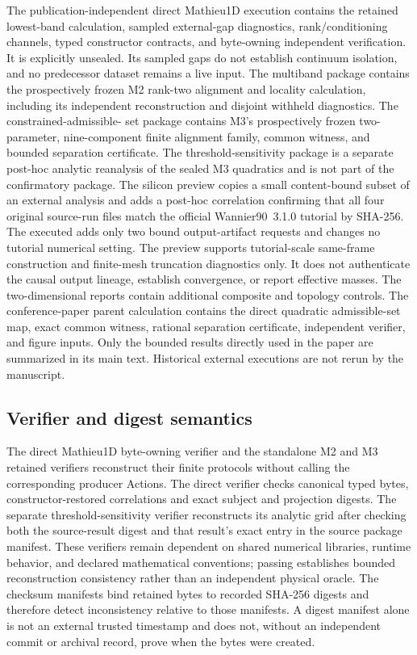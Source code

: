 The publication-independent direct Mathieu1D execution contains the retained lowest-band
calculation, sampled external-gap diagnostics, rank/conditioning channels, typed
constructor contracts, and byte-owning independent verification. It is explicitly
unsealed. Its sampled gaps do not establish continuum isolation, and no predecessor
dataset remains a live input.
The multiband package contains the prospectively frozen
M2 rank-two alignment and locality calculation, including its independent
reconstruction and disjoint withheld diagnostics. The constrained-admissible-
set package contains M3's prospectively frozen two-parameter, nine-component
finite alignment family, common witness, and bounded separation certificate.
The threshold-sensitivity package is a separate post-hoc analytic reanalysis of
the sealed M3 quadratics and is not part of the confirmatory package. The
silicon preview copies a small content-bound subset of an external analysis and
adds a post-hoc correlation confirming that all four original source-run files
match the official Wannier90~3.1.0  tutorial by
SHA-256. The executed  adds only two bound output-artifact
requests and changes no tutorial numerical setting. The preview supports
tutorial-scale same-frame construction and finite-mesh truncation
diagnostics only. It does not authenticate the causal output lineage,
establish convergence, or report effective masses. The two-dimensional reports
contain additional composite and topology controls.
The conference-paper parent calculation contains the direct quadratic
admissible-set map, exact common witness, rational separation certificate,
independent verifier, and figure inputs. Only the bounded results
directly used in the paper are summarized in its main text. Historical external
executions are not rerun by the manuscript.

\subsection{Verifier and digest semantics}

The direct Mathieu1D byte-owning verifier and the standalone M2 and M3 retained
verifiers reconstruct their finite protocols without calling the corresponding
producer Actions. The direct verifier checks canonical typed bytes,
constructor-restored correlations and exact subject and projection digests. The separate
threshold-sensitivity verifier
reconstructs its analytic grid after checking both the source-result digest and
that result's exact entry in the source package manifest. These verifiers
remain dependent on shared numerical libraries, runtime behavior, and declared
mathematical conventions; passing establishes bounded reconstruction
consistency rather than an independent physical oracle.
The checksum manifests bind retained bytes to recorded SHA-256 digests and
therefore detect inconsistency relative to those manifests. A digest manifest
alone is not an external trusted timestamp and does not, without an independent
commit or archival record, prove when the bytes were created.

